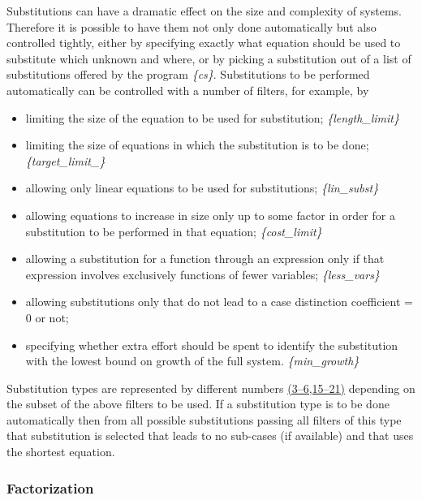 Substitutions can have a dramatic effect on the size and complexity of
systems.  Therefore it is possible to have them not only done
automatically but also controlled tightly, either by specifying
exactly what equation should be used to substitute which unknown and
where, or by picking a substitution out of a list of substitutions
offered by the program \emph{\{cs\}}.  Substitutions to be performed
automatically can be controlled with a number of filters, for example,
by
\begin{itemize}
\item limiting the size of the equation to be used for substitution;
  \emph{\{length\_limit\}}
\item limiting the size of equations in which the substitution is to
  be done; \emph{\{target\_limit\_\}}
\item allowing only linear equations to be used for substitutions;
  \emph{\{lin\_subst\}}
\item allowing equations to increase in size only up to some factor in
  order for a substitution to be performed in that equation;
  \emph{\{cost\_limit\}}
\item allowing a substitution for a function through an expression
  only if that expression involves exclusively functions of fewer
  variables; \emph{\{less\_vars\}}
\item allowing substitutions only that do not lead to a case distinction
  coefficient = 0 or not;
\item specifying whether extra effort should be spent to identify the
  substitution with the lowest bound on growth of the full system.
  \emph{\{min\_growth\}}
\end{itemize}
Substitution types are represented by different numbers
\hyperref[crack-m_3]{(3--6,15--21)} depending on the subset of the
above filters to be used.  If a substitution type is to be done
automatically then from all possible substitutions passing all filters
of this type that substitution is selected that leads to no sub-cases
(if available) and that uses the shortest equation.

\subsubsection{Factorization}

